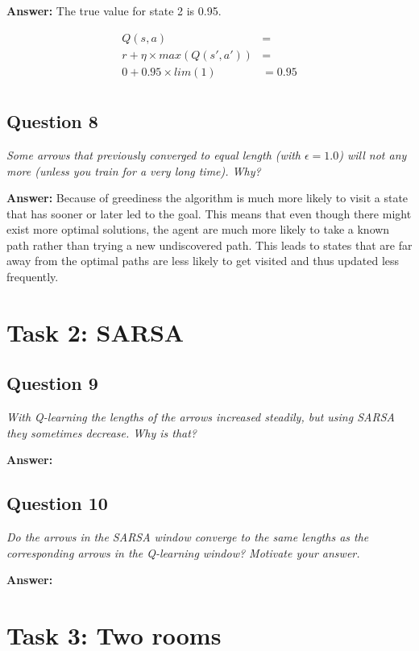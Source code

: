 \documentclass[a4paper]{article}
\begin{document}
\textbf{Answer:} The true value for state 2 is 0.95.

\begin{align*}
Q(s, a)                    &= \\
r + \eta \times max(Q(s', a'))   &= \\
0 + 0.95 \times lim(1) &= 0.95 \\
\end{align*}

\subsection*{Question 8}
\emph{Some arrows that previously converged to equal length (with $\epsilon = 1.0$) will not any more (unless you train for a very long time). Why?}

\textbf{Answer:} Because of greediness the algorithm is much more likely to visit a state that has sooner or later led to the goal. This means that even though there might exist more optimal solutions, the agent are much more likely to take a known path rather than trying a new undiscovered path. 
This leads to states that are far away from the optimal paths are less likely to get visited and thus updated less frequently.

\section{Task 2: SARSA}

\subsection*{Question 9}
\emph{With Q-learning the lengths of the arrows increased steadily, but
using SARSA they sometimes decrease. Why is that?}

\textbf{Answer:} 

\subsection*{Question 10}
\emph{Do the arrows in the SARSA window converge to the same
lengths as the corresponding arrows in the Q-learning window? Motivate your answer.}

\textbf{Answer:} 

\section{Task 3: Two rooms}
\end{document}
